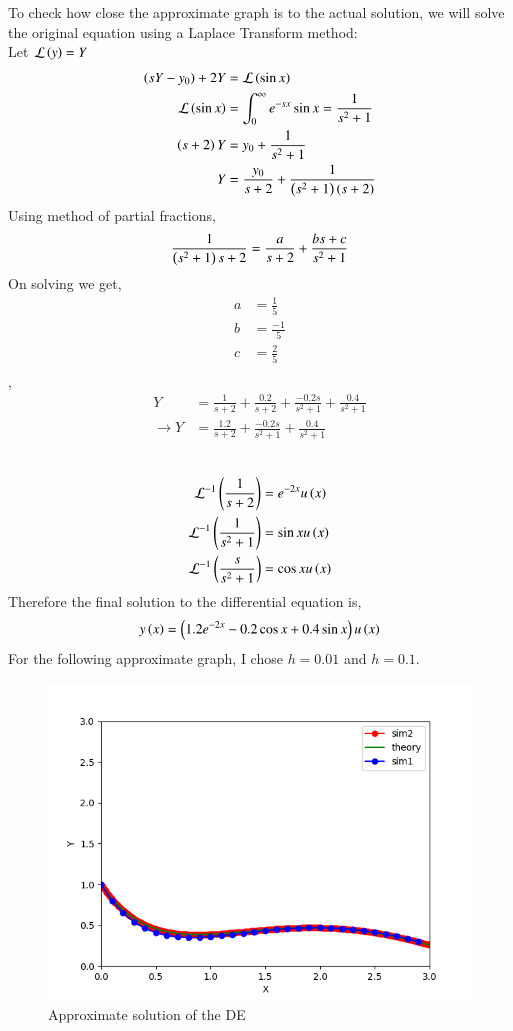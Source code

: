 \documentclass[journal]{IEEEtran}
\begin{document}
To check how close the approximate graph is to the actual solution, we will solve the original 
equation using a Laplace Transform method:\\
Let $\mathcal{L}\left(y\right) = Y$\\
\begin{align}
    \left(sY - y_0\right) +2Y &= \mathcal{L}\left(\sin x\right)\\
    \mathcal{L}\left(\sin x\right) &= \int_{0}^{\infty} e^{-sx}\sin x = \frac{1}{s^2 + 1}\\
    \left(s + 2\right)Y &= y_0 + \frac{1}{s^2 + 1}\\
    Y &= \frac{y_0}{s + 2} + \frac{1}{\left(s^2+1\right)\left(s+2\right)}\\
\end{align}
    Using method of partial fractions,
    \begin{align}   
        \frac{1}{\left(s^2+1\right){s+2}} = \frac{a}{s+2} + \frac{bs + c}{s^2+1}\\
    \end{align}
    On solving we get,
    \begin{align}
        a &= \frac{1}{5}\\
        b &= \frac{-1}{5}\\
        c &= \frac{2}{5}\\
    \end{align}
    ,\\
\begin{align}
    Y &= \frac{1}{s + 2} + \frac{0.2}{s+2} + \frac{-0.2s}{s^2 + 1} + \frac{0.4}{s^2 + 1}\\
    \xrightarrow{} Y &=  \frac{1.2}{s + 2} + \frac{-0.2s}{s^2 + 1} + \frac{0.4}{s^2 + 1}\\
\end{align}
    \\
\begin{align}
    \mathcal{L}^{-1}\left(\frac{1}{s+2}\right) &= e^{-2x}u\left(x\right)\\
    \mathcal{L}^{-1}\left(\frac{1}{s^2+1}\right) &= \sin xu\left(x\right)\\
    \mathcal{L}^{-1}\left(\frac{s}{s^2+1}\right) &= \cos xu\left(x\right)
\end{align}
Therefore the final solution to the differential equation is,
\begin{align}
    y\left(x\right) = \left(1.2e^{-2x} - 0.2\cos x + 0.4\sin x\right)u\left(x\right) 
\end{align}
For the following approximate graph, I chose $h = 0.01$ and $h = 0.1$.
\begin{figure}[h!]
   \centering
   \includegraphics[width=0.7\columnwidth]{figs/fig.png}
    \caption{Approximate solution of the DE}
\end{figure}
\end{document}
